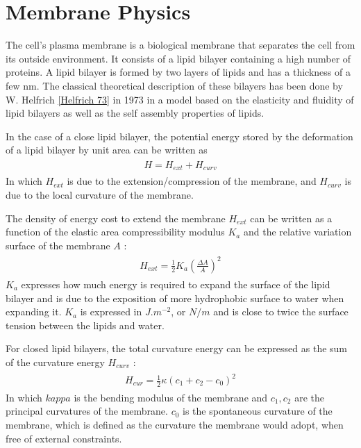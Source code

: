 \documentclass[A4paperpaper,11pt,english]{sphinxmanual}
\begin{document}
\section{Membrane Physics}
\label{parts/part1:membrane-physics}
The cell's plasma membrane is a biological membrane that separates the cell from
its outside environment.  It consists of a lipid bilayer containing
a high number of proteins.  A lipid bilayer is formed by two layers of lipids and has a
thickness of a few nm. The classical theoretical description
of these bilayers has been done by W. Helfrich {\hyperref[parts/part1:helfrich]{{[}Helfrich 73{]}}} in 1973 in a
model based on the elasticity and fluidity of lipid bilayers as well as the
self assembly properties of  lipids.

In the case of a close lipid bilayer, the potential energy stored by the
deformation of a lipid bilayer by unit area can be  written as
\label{parts/part1:equation-eqa1}\begin{gather}
\begin{split}H = H_{ext} + H_{curv}\end{split}\label{parts/part1-eqa1}
\end{gather}
In which \(H_{ext}\) is due to the extension/compression of the membrane,
and \(H_{curv}\) is due to the local curvature of the membrane.

The density of energy cost to extend the membrane \(H_{ext}\) can be written as a
function  of the elastic area compressibility modulus \(K_a\) and the
relative variation surface of the membrane \(A\) :
\label{parts/part1:equation-eqa2}\begin{gather}
\begin{split}H_{ext} = \frac 1 2 K_a \left(\frac{\Delta A}{A}\right)^2\end{split}\label{parts/part1-eqa2}
\end{gather}
\(K_a\) expresses how much energy is required to expand the surface of the
lipid bilayer and is due to the exposition of more hydrophobic surface to water
when expanding it. \(K_a\) is expressed in \(J.m^{-2}\), or \(N/m\)
and is close to twice the surface tension between the lipids and water.

For closed lipid bilayers, the total curvature energy can be expressed as the
sum of the curvature energy \(H_{curv}\) :
\label{parts/part1:equation-eqa3}\begin{gather}
\begin{split}H_{cur} = \frac 1 2 \kappa (c_1 + c_2 -c_0)^2\end{split}\label{parts/part1-eqa3}
\end{gather}
In which \(kappa\) is the bending modulus of the membrane and \(c_1,c_2\)
are the principal curvatures of the membrane. \(c_0\) is the spontaneous
curvature of the membrane, which is defined as the curvature the membrane would adopt, when free of
external constraints.
\end{document}
